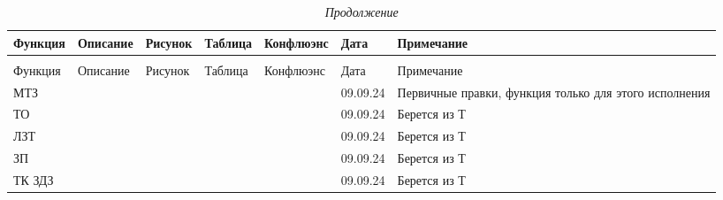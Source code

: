 \begin{flushleft}
\setlength{\extrarowheight}{0.2cm} %
\begin{longtable}{|>{\centering\arraybackslash}m{2cm}|>{\centering\arraybackslash}m{1.5cm}|>{\centering\arraybackslash}m{1.5cm}|>{\centering\arraybackslash}m{1.5cm}|>{\centering\arraybackslash}m{1.5cm}|>{\centering\arraybackslash}m{1.5cm}|>{\centering\arraybackslash}m{5.6cm}|}
\hline
\rowcolor{gray!30}
Функция & Описание & Рисунок & Таблица & Конфлюэнс & Дата & Примечание \\ 
\hline
\endfirsthead
\caption{\emph{Продолжение\hfill\vspace{-0.5\baselineskip}}} \\ %
\hline
\rowcolor{gray!30}
Функция & Описание & Рисунок & Таблица & Конфлюэнс & Дата & Примечание \\ 
\hline
\endhead
\hline
\endfoot
\hline
\endlastfoot
\centering МТЗ & \centering {\color{yellow}\large{\faPlusSquare}} & \centering {\color{yellow}\large{\faPlusSquare}} & \centering {\color{yellow}\large{\faPlusSquare}} & \centering {\color{yellow}\large{\faPlusSquare}} & \centering \color{purple}09.09.24 & \centering\arraybackslash Первичные правки, функция только для этого исполнения \\
\hline
\centering ТО & \centering {\color{teal}\large{\faPlusSquare}} & \centering {\color{teal}\large{\faPlusSquare}} & \centering {\color{teal}\large{\faPlusSquare}} & \centering {\color{teal}\large{\faPlusSquare}} & \centering \color{purple}09.09.24 & \centering\arraybackslash Берется из Т  \\
\hline
\centering ЛЗТ & \centering {\color{teal}\large{\faPlusSquare}} & \centering {\color{teal}\large{\faPlusSquare}} & \centering {\color{teal}\large{\faPlusSquare}} & \centering {\color{teal}\large{\faPlusSquare}} & \centering \color{purple}09.09.24 & \centering\arraybackslash Берется из Т  \\
\hline
\centering ЗП & \centering {\color{teal}\large{\faPlusSquare}} & \centering {\color{teal}\large{\faPlusSquare}} & \centering {\color{teal}\large{\faPlusSquare}} & \centering {\color{teal}\large{\faPlusSquare}} & \color{purple}09.09.24 & \centering\arraybackslash Берется из Т  \\
\hline
\centering ТК ЗДЗ & \centering \centering {\color{teal}\large{\faPlusSquare}} & \centering \centering {\color{teal}\large{\faPlusSquare}} & \centering \centering {\color{teal}\large{\faPlusSquare}} & \centering \centering {\color{teal}\large{\faPlusSquare}} & \color{purple}09.09.24 & \centering\arraybackslash Берется из Т  \\

\end{longtable}
\end{flushleft}
